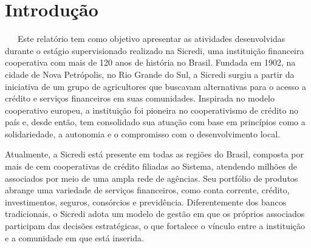 \documentclass[
  12pt,
  a4paper,
]{scrreprt}
\renewcommand*\listfigurename{Lista de Figuras}
\newcommand\listfigurename{Lista de Figuras}
\begin{document}
\pagestyle{fancy}

\fancyhf{}
\fancyhead[RO, LE]{\thepage}
\fancyhead[LO]{\leftmark}
\fancyhead[RE]{\thepage}


\thispagestyle{empty}

\newpage

\bgroup
\hypersetup{linkcolor = black}

\cleardoublepage
\renewcommand{\listfigurename}{\centering{Lista de Figuras}}
\listoffigures
\thispagestyle{empty}

\cleardoublepage
\renewcommand{\listalgorithmname}{\centering{Lista de Algoritmos}}
\listofalgorithms
\thispagestyle{empty}

\egroup

\chapter{Introdução}\label{introduuxe7uxe3o}

~~~Este relatório tem como objetivo apresentar as atividades
desenvolvidas durante o estágio supervisionado realizado na Sicredi, uma
instituição financeira cooperativa com mais de 120 anos de história no
Brasil. Fundada em 1902, na cidade de Nova Petrópolis, no Rio Grande do
Sul, a Sicredi surgiu a partir da iniciativa de um grupo de agricultores
que buscavam alternativas para o acesso a crédito e serviços financeiros
em suas comunidades. Inspirada no modelo cooperativo europeu, a
instituição foi pioneira no cooperativismo de crédito no país e, desde
então, tem consolidado sua atuação com base em princípios como a
solidariedade, a autonomia e o compromisso com o desenvolvimento local.

\vspace{12pt}

Atualmente, a Sicredi está presente em todas as regiões do Brasil,
composta por mais de cem cooperativas de crédito filiadas ao Sistema,
atendendo milhões de associados por meio de uma ampla rede de agências.
Seu portfólio de produtos abrange uma variedade de serviços financeiros,
como conta corrente, crédito, investimentos, seguros, consórcios e
previdência. Diferentemente dos bancos tradicionais, o Sicredi adota um
modelo de gestão em que os próprios associados participam das decisões
estratégicas, o que fortalece o vínculo entre a instituição e a
comunidade em que está inserida.
\end{document}
